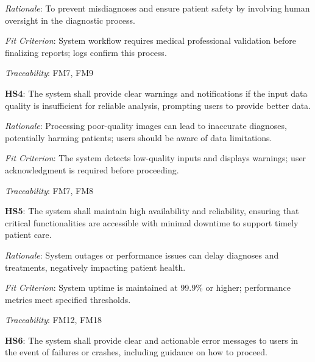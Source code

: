 \documentclass{article}
\begin{document}
\emph{Rationale}: To prevent misdiagnoses and ensure patient safety by involving human oversight in the diagnostic process.

\vspace{0.2cm}

\emph{Fit Criterion}: System workflow requires medical professional validation before finalizing reports; logs confirm this process.

\vspace{0.2cm}

\emph{Traceability}: FM7, FM9

\vspace{0.5cm}

\textbf{HS4}: The system shall provide clear warnings and notifications if the input data quality is insufficient for reliable analysis, prompting users to provide better data.

\emph{Rationale}: Processing poor-quality images can lead to inaccurate diagnoses, potentially harming patients; users should be aware of data limitations.

\vspace{0.2cm}

\emph{Fit Criterion}: The system detects low-quality inputs and displays warnings; user acknowledgment is required before proceeding.

\vspace{0.2cm}

\emph{Traceability}: FM7, FM8

\vspace{0.5cm}

\textbf{HS5}: The system shall maintain high availability and reliability, ensuring that critical functionalities are accessible with minimal downtime to support timely patient care.

\emph{Rationale}: System outages or performance issues can delay diagnoses and treatments, negatively impacting patient health.

\vspace{0.2cm}

\emph{Fit Criterion}: System uptime is maintained at 99.9\% or higher; performance metrics meet specified thresholds.

\vspace{0.2cm}

\emph{Traceability}: FM12, FM18

\vspace{0.5cm}

\textbf{HS6}: The system shall provide clear and actionable error messages to users in the event of failures or crashes, including guidance on how to proceed.
\end{document}
